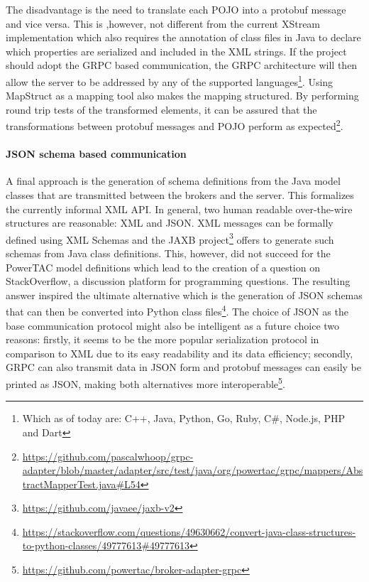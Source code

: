 The disadvantage is the need to translate each \ac{POJO} into a protobuf message and
vice versa. This is ,however, not different from the current XStream implementation which also requires the annotation of
class files in Java to declare which properties are serialized and included in the \ac{XML} strings. If the project
should adopt the \ac{GRPC} based communication, the \ac{GRPC} architecture will then allow the server to be addressed by any of the supported languages\footnote{Which as of today are: C++, Java, Python, Go, Ruby, C\#, Node.js, PHP and
Dart}. Using MapStruct as a mapping tool also makes the mapping structured. By performing round trip tests of the
transformed elements, it can be assured that the transformations between protobuf messages and \ac{POJO} perform as
expected\footnote{\url{https://github.com/pascalwhoop/grpc-adapter/blob/master/adapter/src/test/java/org/powertac/grpc/mappers/AbstractMapperTest.java\#L54}}.



\paragraph{JSON schema based communication}%
\label{sub:json_schema_based_communication}


A final approach is the generation of schema definitions from the Java model classes that are transmitted between the
brokers and the server. This formalizes the currently informal \ac{XML} \ac{API}. In general, two human readable
over-the-wire structures are reasonable: \ac{XML} and \ac{JSON}.  \ac{XML} messages can be formally defined using
\ac{XML} Schemas and the \ac{JAXB} project\footnote{\url{https://github.com/javaee/jaxb-v2}} offers to generate such
schemas from Java class definitions. This, however, did not succeed for the \ac{PowerTAC} model definitions which lead
to the creation of a question on StackOverflow, a discussion platform for programming questions. The resulting answer
inspired the ultimate alternative which is the generation of \ac{JSON} schemas that can then be converted into Python
class
files\footnote{\url{https://stackoverflow.com/questions/49630662/convert-java-class-structures-to-python-classes/49777613\#49777613}}.
The choice of \ac{JSON} as the base communication protocol might also be intelligent as a future choice two reasons:
firstly, it seems to be the more popular serialization protocol in comparison to \ac{XML} \citep{jsonxml} due to its
easy readability and its data efficiency; secondly, \ac{GRPC} can also transmit data in \ac{JSON} form and
protobuf messages can easily be printed as \ac{JSON}, making both alternatives more
interoperable\footnote{\url{https://github.com/powertac/broker-adapter-grpc} }.

